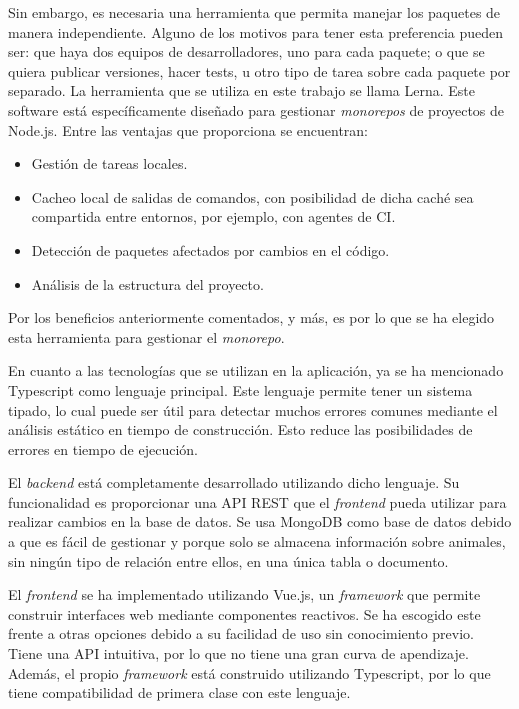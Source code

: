 Sin embargo, es necesaria una herramienta que permita manejar los paquetes de manera independiente. Alguno de los motivos para tener esta preferencia pueden ser: que haya dos equipos de desarrolladores, uno para cada paquete; o que se quiera publicar versiones, hacer tests, u otro tipo de tarea sobre cada paquete por separado. La herramienta que se utiliza en este trabajo se llama Lerna\cite{lerna}. Este software está específicamente diseñado para gestionar \textit{monorepos} de proyectos de Node.js. Entre las ventajas que proporciona se encuentran:

\begin{itemize}
  \item Gestión de tareas locales.
  \item Cacheo local de salidas de comandos, con posibilidad de dicha caché sea compartida entre entornos, por ejemplo, con agentes de CI.
  \item Detección de paquetes afectados por cambios en el código.
  \item Análisis de la estructura del proyecto.
\end{itemize}

Por los beneficios anteriormente comentados, y más, es por lo que se ha elegido esta herramienta para gestionar el \textit{monorepo}.

En cuanto a las tecnologías que se utilizan en la aplicación, ya se ha mencionado Typescript como lenguaje principal. Este lenguaje permite tener un sistema tipado, lo cual puede ser útil para detectar muchos errores comunes mediante el análisis estático en tiempo de construcción. Esto reduce las posibilidades de errores en tiempo de ejecución.

El \textit{backend} está completamente desarrollado utilizando dicho lenguaje. Su funcionalidad es proporcionar una API REST que el \textit{frontend} pueda utilizar para realizar cambios en la base de datos. Se usa MongoDB\cite{mongodb} como base de datos debido a que es fácil de gestionar y porque solo se almacena información sobre animales, sin ningún tipo de relación entre ellos, en una única tabla o documento.

El \textit{frontend} se ha implementado utilizando Vue.js\cite{vue}, un \textit{framework} que permite construir interfaces web mediante componentes reactivos. Se ha escogido este frente a otras opciones debido a su facilidad de uso sin conocimiento previo. Tiene una API intuitiva, por lo que no tiene una gran curva de apendizaje. Además, el propio \textit{framework} está construido utilizando Typescript, por lo que tiene compatibilidad de primera clase con este lenguaje.

